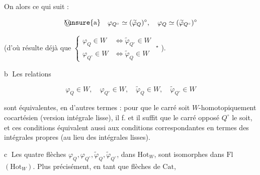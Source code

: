 On  alors ce qui suit :

\[
\text{\textcircled{\unsure{a}}}\quad \varphi_{Q^\circ}\simeq(\widetilde\varphi_Q)^\circ,\quad \varphi_Q\simeq(\widetilde\varphi_{Q^\circ})^\circ
\]

(d'où résulte déjà que $\left\{\begin{aligned}\varphi_Q\in W&\Longleftrightarrow\widetilde\varphi_{Q^\circ}\in W\\\varphi_{Q^\circ}\in W&\Longleftrightarrow\widetilde\varphi_Q\in W\end{aligned}\right.$ \unsure{\deleted{)}} ${}^{\star}$
).

\textcircled{b} Les relations

\[
\varphi_Q\in W,\quad \varphi_{Q^\circ}\in W,\quad \widetilde\varphi_Q\in W,\quad \widetilde\varphi_{Q^\circ}\in W
\]

sont équivalentes, en d'autres termes : pour que le carré soit $W$-homotopiquement cocartésien (version intégrale lisse), il f. et il suffit que le carré opposé $Q^\circ$ le soit, et ces conditions équivalent aussi aux conditions correspondantes en termes des intégrales propres (au lieu des intégrales lisses).

\textcircled{c} Les quatre flèches $\varphi_Q,\varphi_{Q^\circ},\widetilde\varphi_Q,\widetilde\varphi_{Q^\circ}$,  dans $\mathrm{Hot}_W$, sont isomorphes dans \uline{$\mathrm{Fl}$}$(\mathrm{Hot}_W)$. Plus précisément, en tant que flèches de $\mathrm{Cat}$,

